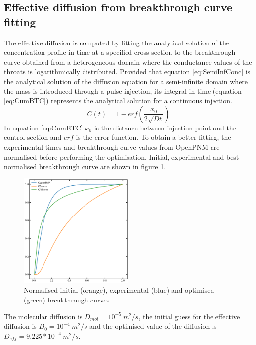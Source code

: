 \documentclass{article}
\begin{document}
\subsection{Effective diffusion from breakthrough curve fitting}
The effective diffusion is computed by fitting the analytical solution of the concentration profile in time at a specified cross section to the breakthrough curve obtained from a heterogeneous domain where the conductance values of the throats is logarithmically distributed. Provided that equation \ref{eq:SemiInfConc} is the analytical solution of the diffusion equation for a semi-infinite domain where the mass is introduced through a pulse injection, its integral in time (equation \ref{eq:CumBTC}) represents the analytical solution for a continuous injection.
\begin{equation}
    C(t) = 1 - erf \left( \frac{x_0}{2 \sqrt{D t}} \right)
    \label{eq:CumBTC}
\end{equation}
In equation \ref{eq:CumBTC} $x_0$ is the distance between injection point and the control section and $erf$ is the error function.
To obtain a better fitting, the experimental times and breakthrough curve values from OpenPNM are normalised before performing the optimisation. Initial, experimental and best normalised breakthrough curve are shown in figure \ref{fig:NormBTC}.
\begin{figure}[htbp]
    \centering
    \includegraphics[width=0.5\textwidth]{images/fromOpenPNM/NormBTC.png}
    \caption{Normalised initial (orange), experimental (blue) and optimised (green) breakthrough curves}
    \label{fig:NormBTC}
\end{figure}
The molecular diffusion is $D_{mol}=10^{-5} \: m^2/s$, the initial guess for the effective diffusion is $D_{0}=10^{-4} \: m^2/s$ and the optimised value of the diffusion is $D_{eff}=9.225*10^{-4} \: m^2/s$.

\FloatBarrier  %
\end{document}

